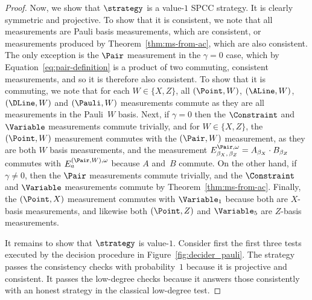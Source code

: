 \begin{proof}
  Now, we show that $\strategy$ is a value-$1$ SPCC strategy.
  It is clearly symmetric and projective. 
  To show that it is consistent, we note that all measurements are Pauli basis
  measurements, which are consistent, or measurements produced by
  Theorem~\ref{thm:ms-from-ac}, which are also consistent.
  The only exception is the $\Pair$ measurement in the $\gamma = 0$ case, which
  by Equation~\eqref{eq:pair-definition} is a product of two commuting,
  consistent measurements, and so it is therefore also consistent.
  To show that it is commuting, we note that for each $W \in \{X, Z\}$, all
  $(\Point, W)$, $(\ALine, W)$, $(\DLine,W)$ and $(\Pauli, W)$ measurements
  commute as they are all measurements in the Pauli~$W$ basis.
  Next, if $\gamma = 0$ then the $\Constraint$ and $\Variable$ measurements
  commute trivially, and for $W \in \{X, Z\}$, the $(\Point, W)$ measurement
  commutes with the $(\Pair, W)$ measurement, as they are both $W$ basis
  measurements, and the measurement $E^{\Pair, \omega}_{\beta_X, \, \beta_Z} =
  A_{\beta_X}\cdot B_{\beta_Z}$ commutes with $E^{(\Pair, W), \omega}_{a}$
  because $A$ and~$B$ commute.
  On the other hand, if $\gamma \neq 0$, then the $\Pair$ measurements commute
  trivially, and the $\Constraint$ and $\Variable$ measurements commute by
  Theorem~\ref{thm:ms-from-ac}.
  Finally, the $(\Point, X)$ measurement commutes with $\Variable_1$ because
  both are $X$-basis measurements, and likewise both $(\Point, Z)$ and
  $\Variable_5$ are $Z$-basis measurements.
  
  It remains to show that $\strategy$ is value-$1$.
	Consider first the first three tests executed by the decision procedure in
  Figure~\ref{fig:decider_pauli}.
  The strategy passes the consistency checks with probability~$1$ because it is
  projective and consistent.
  It passes the low-degree checks because it answers those consistently with an
  honest strategy in the classical low-degree test.
		

\end{proof}
